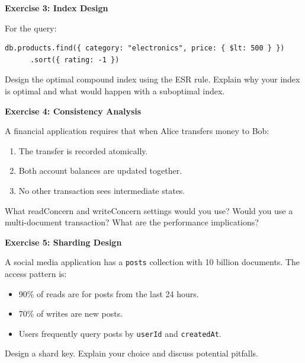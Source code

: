 \documentclass[12pt,a4paper]{article}
\begin{document}
\begin{exercise}
\textbf{Exercise 3: Index Design}

For the query:
\begin{verbatim}
db.products.find({ category: "electronics", price: { $lt: 500 } })
      .sort({ rating: -1 })
\end{verbatim}

Design the optimal compound index using the ESR rule. Explain why your index is optimal and what would happen with a suboptimal index.
\end{exercise}

\begin{exercise}
\textbf{Exercise 4: Consistency Analysis}

A financial application requires that when Alice transfers money to Bob:
\begin{enumerate}[noitemsep]
    \item The transfer is recorded atomically.
    \item Both account balances are updated together.
    \item No other transaction sees intermediate states.
\end{enumerate}

What readConcern and writeConcern settings would you use? Would you use a multi-document transaction? What are the performance implications?
\end{exercise}

\begin{exercise}
\textbf{Exercise 5: Sharding Design}

A social media application has a \texttt{posts} collection with 10 billion documents. The access pattern is:
\begin{itemize}[noitemsep]
    \item 90\% of reads are for posts from the last 24 hours.
    \item 70\% of writes are new posts.
    \item Users frequently query posts by \texttt{userId} and \texttt{createdAt}.
\end{itemize}

Design a shard key. Explain your choice and discuss potential pitfalls.
\end{exercise}
\end{document}
